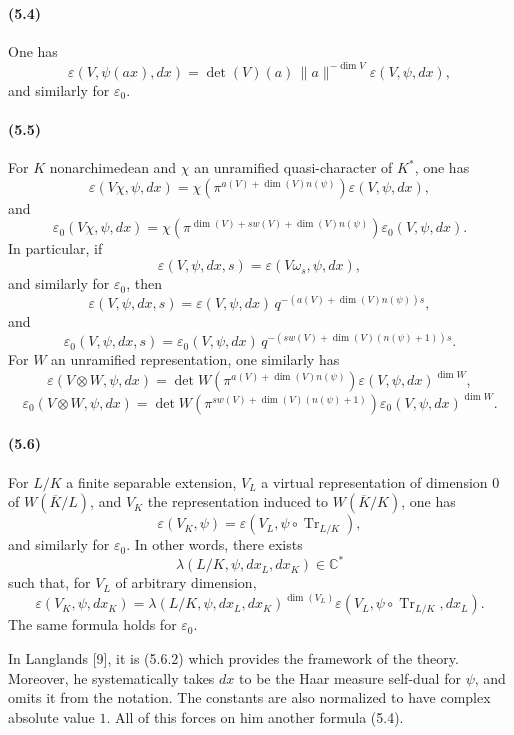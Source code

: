 \documentclass[10pt,letterpaper]{article}
\newcommand{\C}{\mathbb C}
\newcommand{\Tr}{\operatorname{Tr}}
\providecommand{\Tr}{\operatorname{Tr}}
\providecommand{\Tr}{\operatorname{Tr}}
\providecommand{\Tr}{\operatorname{Tr}}
\begin{document}
\paragraph{(5.4)} One has
\[
\varepsilon(V,\psi(ax),dx)
=
\det(V)(a)\,\|a\|^{-\dim V}\varepsilon(V,\psi,dx),
\]
and similarly for \(\varepsilon_0\).

\paragraph{(5.5)} For \(K\) nonarchimedean and \(\chi\) an unramified quasi-character of \(K^*\), one has
\[
\tag{5.5.1}
\varepsilon(V\chi,\psi,dx)
=
\chi\!\left(\pi^{a(V)+\dim(V)n(\psi)}\right)\varepsilon(V,\psi,dx),
\]
and
\[
\varepsilon_0(V\chi,\psi,dx)
=
\chi\!\left(\pi^{\dim(V)+sw(V)+\dim(V)n(\psi)}\right)
\varepsilon_0(V,\psi,dx).
\]
In particular, if
\[
\varepsilon(V,\psi,dx,s)=\varepsilon(V\omega_s,\psi,dx),
\]
and similarly for \(\varepsilon_0\), then
\[
\tag{5.5.2}
\varepsilon(V,\psi,dx,s)
=
\varepsilon(V,\psi,dx)\,
q^{-(a(V)+\dim(V)n(\psi))s},
\]
and
\[
\varepsilon_0(V,\psi,dx,s)
=
\varepsilon_0(V,\psi,dx)\,
q^{-(sw(V)+\dim(V)(n(\psi)+1))s}.
\]
For \(W\) an unramified representation, one similarly has
\[
\tag{5.5.3}
\varepsilon(V\otimes W,\psi,dx)
=
\det W\!\left(\pi^{a(V)+\dim(V)n(\psi)}\right)
\varepsilon(V,\psi,dx)^{\dim W},
\]
\[
\varepsilon_0(V\otimes W,\psi,dx)
=
\det W\!\left(\pi^{sw(V)+\dim(V)(n(\psi)+1)}\right)
\varepsilon_0(V,\psi,dx)^{\dim W}.
\]

\paragraph{(5.6)} For \(L/K\) a finite separable extension, \(V_L\) a virtual representation of dimension \(0\) of \(W(\overline K/L)\), and \(V_K\) the representation induced to \(W(\overline K/K)\), one has
\[
\tag{5.6.1}
\varepsilon(V_K,\psi)=\varepsilon(V_L,\psi\circ\Tr_{L/K}),
\]
and similarly for \(\varepsilon_0\). In other words, there exists
\[
\lambda(L/K,\psi,dx_L,dx_K)\in\C^*
\]
such that, for \(V_L\) of arbitrary dimension,
\[
\tag{5.6.2}
\varepsilon(V_K,\psi,dx_K)
=
\lambda(L/K,\psi,dx_L,dx_K)^{\dim(V_L)}
\varepsilon(V_L,\psi\circ\Tr_{L/K},dx_L).
\]
The same formula holds for \(\varepsilon_0\).

In Langlands [9], it is (5.6.2) which provides the framework of the theory. Moreover, he systematically takes \(dx\) to be the Haar measure self-dual for \(\psi\), and omits it from the notation. The constants are also normalized to have complex absolute value \(1\). All of this forces on him another formula (5.4).
\end{document}
